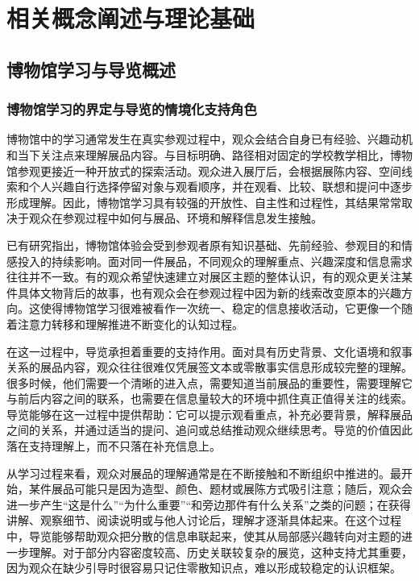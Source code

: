 \chapter{相关概念阐述与理论基础}

\section{博物馆学习与导览概述}

\subsection{博物馆学习的界定与导览的情境化支持角色}
博物馆中的学习通常发生在真实参观过程中，观众会结合自身已有经验、兴趣动机和当下关注点来理解展品内容\cite{falk2016,li2024}。与目标明确、路径相对固定的学校教学相比，博物馆参观更接近一种开放式的探索活动。观众进入展厅后，会根据展陈内容、空间线索和个人兴趣自行选择停留对象与观看顺序，并在观看、比较、联想和提问中逐步形成理解\cite{falk2016}。因此，博物馆学习具有较强的开放性、自主性和过程性，其结果常常取决于观众在参观过程中如何与展品、环境和解释信息发生接触。

已有研究指出，博物馆体验会受到参观者原有知识基础、先前经验、参观目的和情感投入的持续影响\cite{falk2016,li2024}。面对同一件展品，不同观众的理解重点、兴趣深度和信息需求往往并不一致。有的观众希望快速建立对展区主题的整体认识，有的观众更关注某件具体文物背后的故事，也有观众会在参观过程中因为新的线索改变原本的兴趣方向\cite{falk2016}。这使得博物馆学习很难被看作一次统一、稳定的信息接收活动，它更像一个随着注意力转移和理解推进不断变化的认知过程。

在这一过程中，导览承担着重要的支持作用\cite{falk2016,li2024}。面对具有历史背景、文化语境和叙事关系的展品内容，观众往往很难仅凭展签文本或零散事实信息形成较完整的理解。很多时候，他们需要一个清晰的进入点，需要知道当前展品的重要性，需要理解它与前后内容之间的联系，也需要在信息量较大的环境中抓住真正值得关注的线索。导览能够在这一过程中提供帮助：它可以提示观看重点，补充必要背景，解释展品之间的关系，并通过适当的提问、追问或总结推动观众继续思考\cite{falk2016,li2024}。导览的价值因此落在支持理解上，而不只落在补充信息上。

从学习过程来看，观众对展品的理解通常是在不断接触和不断组织中推进的。最开始，某件展品可能只是因为造型、颜色、题材或展陈方式吸引注意；随后，观众会进一步产生“这是什么”“为什么重要”“和旁边那件有什么关系”之类的问题；在获得讲解、观察细节、阅读说明或与他人讨论后，理解才逐渐具体起来\cite{falk2016,li2024}。在这个过程中，导览能够帮助观众把分散的信息串联起来，使其从局部感兴趣转向对主题的进一步理解。对于部分内容密度较高、历史关联较复杂的展览，这种支持尤其重要，因为观众在缺少引导时很容易只记住零散知识点，难以形成较稳定的认识框架。

